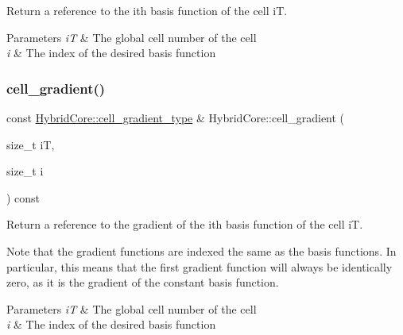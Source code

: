 Return a reference to the i\textquotesingle{}th basis function of the cell iT. 


\begin{DoxyParams}{Parameters}
{\em iT} & The global cell number of the cell \\
\hline
{\em i} & The index of the desired basis function \\
\hline
\end{DoxyParams}
\mbox{\label{classHArDCore2D_1_1HybridCore_a710fc23b914623b90a2699ab4291e539}} 
\subsubsection{\texorpdfstring{cell\+\_\+gradient()}{cell\_gradient()}}
{\footnotesize\ttfamily const \hyperlink{classHArDCore2D_1_1HybridCore_a41350d7c3ac5a5a5e932348d2c9d0750}{Hybrid\+Core\+::cell\+\_\+gradient\+\_\+type} \& Hybrid\+Core\+::cell\+\_\+gradient (\begin{DoxyParamCaption}\item[{size\+\_\+t}]{iT,  }\item[{size\+\_\+t}]{i }\end{DoxyParamCaption}) const}



Return a reference to the gradient of the i\textquotesingle{}th basis function of the cell iT. 

Note that the gradient functions are indexed the same as the basis functions. In particular, this means that the first gradient function will always be identically zero, as it is the gradient of the constant basis function. 
\begin{DoxyParams}{Parameters}
{\em iT} & The global cell number of the cell \\
\hline
{\em i} & The index of the desired basis function \\
\hline
\end{DoxyParams}
\mbox{\label{classHArDCore2D_1_1HybridCore_aa7006921a9e212784abf688f63a855a0}} 
